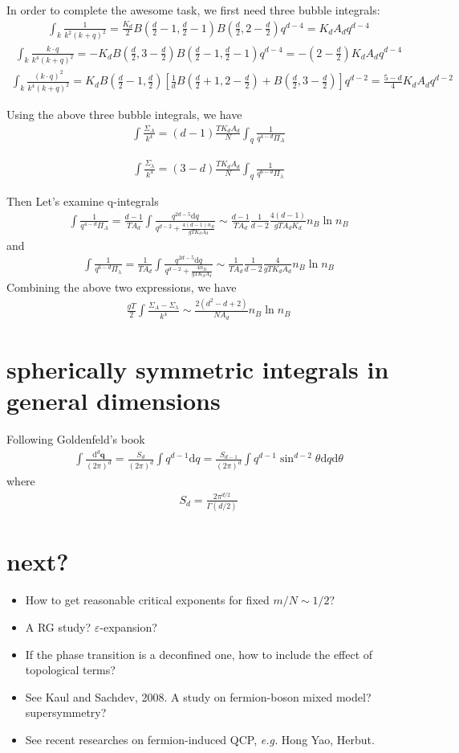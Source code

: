\documentclass[aps,notitlepage]{revtex4-1}
\newcommand{\bea}{\begin{eqnarray}}
\newcommand{\eea}{\end{eqnarray}}
\newcommand{\bq}{\mathbf{q}}
\newcommand{\md}{\mathrm{d}}
\begin{document}
\begin{appendix}
In order to complete the awesome task, we first need three bubble integrals:
\bea \int_k \frac{1}{k^2(k+q)^2} = \frac{K_d}{2} B\left( \frac{d}{2}-1,\frac{d}{2}-1 \right) B\left( \frac{d}{2},2-\frac{d}{2} \right) q^{d-4} = K_d A_d q^{d-4}\eea
\bea \int_k \frac{k\cdot q}{k^4(k+q)^2}=-K_d B\left(\frac{d}{2},3-\frac{d}{2}\right)B\left(\frac{d}{2}-1,\frac{d}{2}-1\right) q^{d-4} = -\left(2-\frac{d}{2}\right) K_d A_d q^{d-4} \eea
\bea \int_k \frac{(k\cdot q)^2}{k^4(k+q)^2} = K_d B\left(\frac{d}{2}-1,\frac{d}{2}\right)\left[\frac{1}{d}B\left(\frac{d}{2}+1,2-\frac{d}{2}\right)+B\left(\frac{d}{2},3-\frac{d}{2}\right)\right] q^{d-2} = \frac{5-d}{4} K_dA_d q^{d-2}\eea 

Using the above three bubble integrals, we have
\bea \int \frac{\Sigma_A}{k^4} = (d-1) \frac{TK_dA_d}{N} \int_q \frac{1}{q^{4-d}\Pi_A} \eea

\bea \int \frac{\Sigma_\lambda}{k^4} = (3-d) \frac{TK_dA_d}{N} \int_q \frac{1}{q^{6-d}\Pi_\lambda} \eea

Then Let's examine q-integrals
\bea \int \frac{1}{q^{4-d}\Pi_A}=\frac{d-1}{TA_d}\int \frac{q^{2d-5}\md q}{q^{d-2}+\frac{4(d-1)n_B}{gTK_dA_d}} \sim \frac{d-1}{TA_d}\frac{1}{d-2}\frac{4(d-1)}{gTA_dK_d} n_B \ln n_B \eea
and 
\bea \int \frac{1}{q^{6-d}\Pi_\lambda}=\frac{1}{TA_d} \int \frac{q^{2d-5}\md q}{q^{d-2}+\frac{4n_B}{gTK_dA_d}} \sim \frac{1}{TA_d}\frac{1}{d-2}\frac{4}{gTK_dA_d} n_B \ln n_B \eea
Combining the above two expressions, we have
\bea \frac{gT}{2}\int \frac{\Sigma_A-\Sigma_\lambda}{k^4} \sim \frac{2(d^2-d+2)}{NA_d} n_B\ln n_B \eea 

\section{spherically symmetric integrals in general dimensions}
Following Goldenfeld's book
\bea \int \frac{\md^d\bq}{(2\pi)^d}=\frac{S_d}{(2\pi)^d}\int q^{d-1}\md q = \frac{S_{d-1}}{(2\pi)^d}\int q^{d-1}\sin^{d-2}\theta \md q \md \theta \eea
where \bea S_d=\frac{2\pi^{d/2}}{\Gamma(d/2)} \eea



\section{next?}
\begin{itemize}
\item How to get reasonable critical exponents for fixed $m/N\sim1/2$? 
\item A RG study? $\varepsilon$-expansion?
\item If the phase transition is a deconfined one, how to include the effect of topological terms?
\item See Kaul and Sachdev, 2008. A study on fermion-boson mixed model? supersymmetry?
\item See recent researches on fermion-induced QCP, {\it e.g.} Hong Yao, Herbut.
\end{itemize}

\end{appendix}
\end{document}
